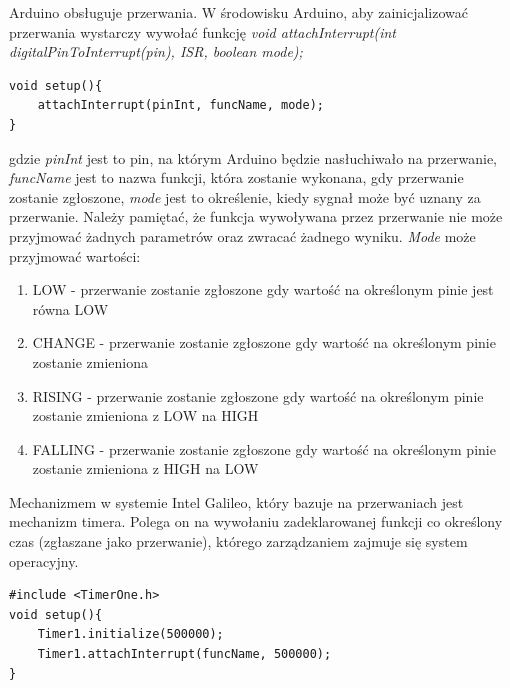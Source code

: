 \documentclass{xmgr}
\begin{document}
Arduino obsługuje przerwania. W środowisku Arduino, aby zainicjalizować przerwania wystarczy wywołać funkcję \emph{
void attachInterrupt(int digitalPinToInterrupt(pin), ISR, boolean mode);}

\begin{lstlisting}[label=bot-dirs-alg,caption=Inicjowanie przerwań sprzętowych w środowisku Arduino]
void setup(){
	attachInterrupt(pinInt, funcName, mode);
}
\end{lstlisting}
gdzie \emph{pinInt} jest to pin, na którym Arduino będzie nasłuchiwało na przerwanie, \emph{funcName} jest to nazwa funkcji, która zostanie wykonana, gdy przerwanie zostanie zgłoszone, \emph{mode} jest to określenie, kiedy sygnał może być uznany za przerwanie. Należy pamiętać, że funkcja wywoływana przez przerwanie nie może przyjmować żadnych parametrów oraz zwracać żadnego wyniku. \emph{Mode} może przyjmować wartości:
 
\begin{enumerate}
	\item LOW - przerwanie zostanie zgłoszone gdy wartość na określonym pinie jest równa LOW
	\item CHANGE - przerwanie zostanie zgłoszone gdy wartość na określonym pinie zostanie zmieniona
	\item RISING - przerwanie zostanie zgłoszone gdy wartość na określonym pinie zostanie zmieniona z LOW na HIGH
	\item FALLING - przerwanie zostanie zgłoszone gdy wartość na określonym pinie zostanie zmieniona z HIGH na LOW
\end{enumerate}

Mechanizmem w systemie Intel Galileo, który bazuje na przerwaniach jest mechanizm timera. Polega on na wywołaniu zadeklarowanej funkcji co określony czas (zgłaszane jako przerwanie), którego zarządzaniem zajmuje się system operacyjny.
\begin{lstlisting}[label=bot-dirs-alg,caption=Przykładowe użycie timera w środowisku Arduino]
#include <TimerOne.h>
void setup(){
	Timer1.initialize(500000);
	Timer1.attachInterrupt(funcName, 500000);
}
\end{lstlisting}
\end{document}

